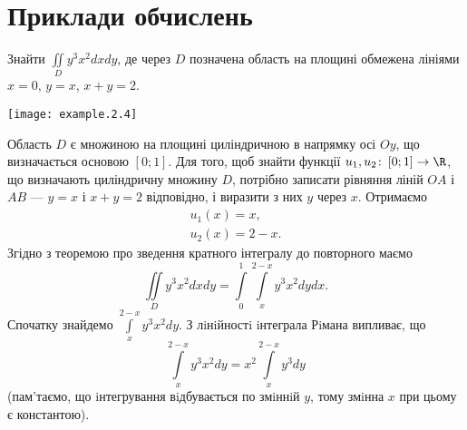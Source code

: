 \section{Приклади обчислень}
\begin{example}
Знайти ${\iint\limits_D y^3 x^2 d x d y}$, де через $D$ позначена область на площині обмежена лініями ${x = 0}$, ${y = x}$, ${x + y = 2}$.

\texttt{[image: example.2.4]}

Область $D$ є множиною на площині циліндричною в напрямку осі ${Oy}$, що визначається основою ${\left[0;1\right]}$. Для того, щоб знайти функції ${u_1, u_2\colon \left[0;1\right]\to \R}$, що визначають циліндричну множину $D$, потрібно записати рівняння ліній ${OA}$ і ${AB}$ --- ${y = x}$ і ${x + y =2 }$ відповідно, і виразити з них $y$ через $x$. Отримаємо
\[
\begin{array}{l}
u_1(x) = x,\\ u_2(x) = 2 - x.
\end{array}
\]
Згідно з теоремою про зведення кратного інтегралу до повторного маємо
\[
\iint\limits_D y^3 x^2 d x d y = \int\limits_0^1 \int\limits_{x}^{2 - x} y^3 x^2 d y d x.
\]
Спочатку знайдемо ${\int\limits_{x}^{2 - x} y^3 x^2 d y}$. З лiнiйностi iнтеграла Рiмана випливає, що
\[
\int\limits_{x}^{2 - x} y^3 x^2 d y = x^2 \int\limits_{x}^{2 - x} y^3  d y
\]
(пам’таємо, що iнтегрування вiдбувається по змiннiй $y$, тому змiнна $x$ при цьому є константою).


\end{example}
